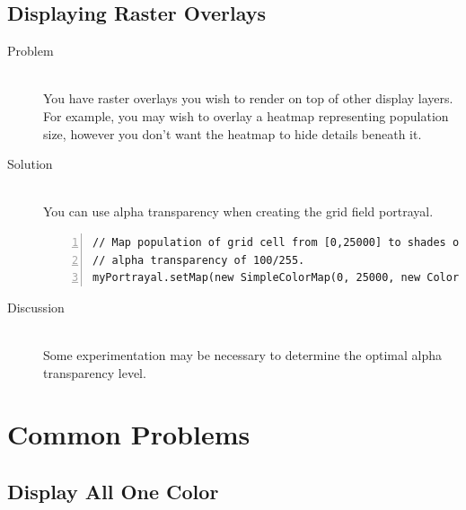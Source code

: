 \documentclass[twoside,10pt]{book}
\begin{document}
\section{Displaying Raster Overlays}
\label{sec:displayingrasteroverlays}

\begin{description}
\item[Problem]~\\
  You have raster overlays you wish to render on top of other display
  layers.  For example, you may wish to overlay a heatmap representing
  population size, however you don't want the heatmap to hide details
  beneath it.

\item[Solution]~\\
You can use alpha transparency when creating the grid field portrayal.  

\begin{Verbatim}[frame=lines,framesep=5mm,numbers=left]
// Map population of grid cell from [0,25000] to shades of red from [0,255] with 
// alpha transparency of 100/255.
myPortrayal.setMap(new SimpleColorMap(0, 25000, new Color(0,0,0,100), new Color(255,0,0,100)));
\end{Verbatim}

\item[Discussion]~\\
Some experimentation may be necessary to determine the optimal alpha transparency level.
\end{description}







\chapter{Common Problems}
\label{ch:commonprobs}


\section{Display All One Color}
\label{sec:OneColorDisplay}
\end{document}
